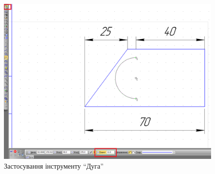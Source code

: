 \begin{enumerate}[leftmargin=*]
\begin{figure}[!ht]
          \includegraphics[width=0.9\linewidth]{./images/lab3/step4.png}
          \caption{Застосування інструменту ``Дуга''}
          \label{fig:lab3:step3} 
        \end{figure}


\end{enumerate}
